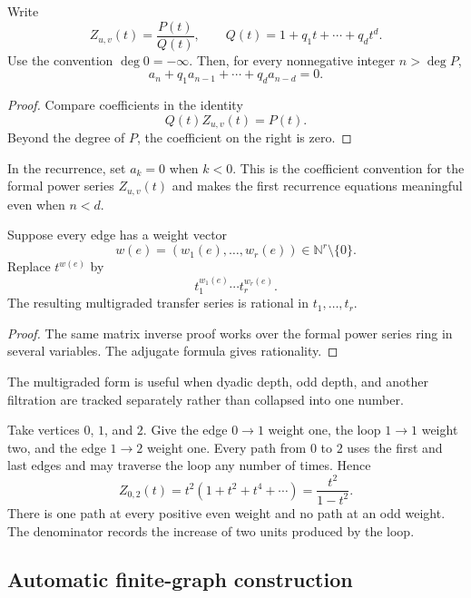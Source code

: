 \begin{corollary}\label{cor:path_recurrence}
Write
\[
Z_{u,v}(t)=\frac{P(t)}{Q(t)},
\qquad
Q(t)=1+q_1t+\cdots+q_dt^d.
\]
Use the convention $\deg 0=-\infty$. Then, for every nonnegative integer $n>\deg P$,
\[
a_n+q_1a_{n-1}+\cdots+q_da_{n-d}=0.
\]
\end{corollary}

\begin{proof}
Compare coefficients in the identity
\[
Q(t)Z_{u,v}(t)=P(t).
\]
Beyond the degree of $P$, the coefficient on the right is zero.
\end{proof}

In the recurrence, set $a_k=0$ when $k<0$. This is the coefficient convention for the formal power series $Z_{u,v}(t)$ and makes the first recurrence equations meaningful even when $n<d$.

\begin{corollary}\label{cor:multigraded_series}
Suppose every edge has a weight vector
\[
w(e)=(w_1(e),\ldots,w_r(e))\in\mathbb N^r\setminus\{0\}.
\]
Replace $t^{w(e)}$ by
\[
t_1^{w_1(e)}\cdots t_r^{w_r(e)}.
\]
The resulting multigraded transfer series is rational in $t_1,\ldots,t_r$.
\end{corollary}

\begin{proof}
The same matrix inverse proof works over the formal power series ring in several variables.  The adjugate formula gives rationality.
\end{proof}

The multigraded form is useful when dyadic depth, odd depth, and another filtration are tracked separately rather than collapsed into one number.

\begin{example}\label{ex:simple_transfer_series}
Take vertices $0$, $1$, and $2$.  Give the edge $0\to1$ weight one, the loop $1\to1$ weight two, and the edge $1\to2$ weight one.  Every path from $0$ to $2$ uses the first and last edges and may traverse the loop any number of times.  Hence
\[
Z_{0,2}(t)
=
t^2(1+t^2+t^4+\cdots)
=
\frac{t^2}{1-t^2}.
\]
There is one path at every positive even weight and no path at an odd weight.  The denominator records the increase of two units produced by the loop.
\end{example}

\subsection{Automatic finite-graph construction}

